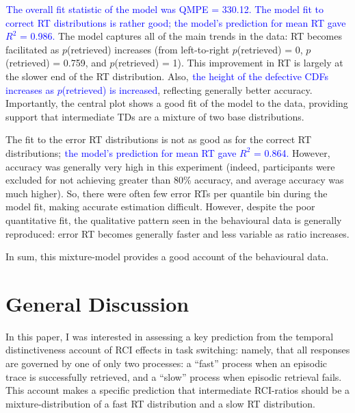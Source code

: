 \documentclass[a4paper, man, natbib]{apa6}
\newcommand{\jg}[1]{\textcolor{blue}{$^{\textrm{}}${#1}}}
\begin{document}
\jg{The overall fit statistic of the model was QMPE = 330.12. The model fit to correct RT distributions is rather good; the model's prediction for mean RT gave $R^{2}$ = 0.986.} The model captures all of the main trends in the data: RT becomes facilitated as $p$(retrieved) increases (from left-to-right $p$(retrieved) = 0, $p$(retrieved) = 0.759, and $p$(retrieved) = 1). This improvement in RT is largely at the slower end of the RT distribution. Also, \jg{the height of the defective CDFs increases as $p$(retrieved) is increased}, reflecting generally better accuracy. Importantly, the central plot shows a good fit of the model to the data, providing support that intermediate TDs are a mixture of two base distributions. 

The fit to the error RT distributions is not as good as for the correct RT distributions; \jg{the model's prediction for mean RT gave $R^{2}$ = 0.864.} However, accuracy was generally very high in this experiment (indeed, participants were excluded for not achieving greater than 80\% accuracy, and average accuracy was much higher). So, there were often few error RTs per quantile bin during the model fit, making accurate estimation difficult. However, despite the poor quantitative fit, the qualitative pattern seen in the behavioural data is generally reproduced: error RT becomes generally faster and less variable as ratio increases.

In sum, this mixture-model provides a good account of the behavioural data.


\section{General Discussion}

In this paper, I was interested in assessing a key prediction from the temporal distinctiveness account of RCI effects in task switching: namely, that all responses are governed by one of only two processes: a ``fast'' process when an episodic trace is successfully retrieved, and a ``slow'' process when episodic retrieval fails. This account makes a specific prediction that intermediate RCI-ratios should be a mixture-distribution of a fast RT distribution and a slow RT distribution. 
\end{document}
